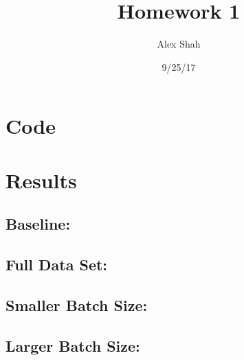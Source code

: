 \documentclass[10pt,a4paper]{report}
\title{Homework 1}
\author{Alex Shah}
\date{9/25/17}
\begin{document}
\lstset{language=Python}
\maketitle

\section{Code}

\clearpage

\section{Results}
\subsection{Baseline:}

\clearpage
\subsection{Full Data Set:}

\clearpage
\subsection{Smaller Batch Size:}

\clearpage
\subsection{Larger Batch Size:}

\clearpage
\end{document}
